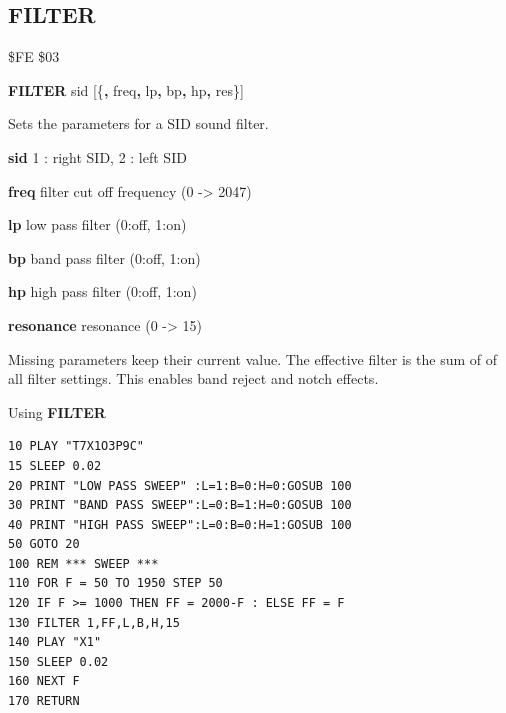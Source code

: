 
\newpage
\subsection{FILTER}
\begin{description}[leftmargin=2cm,style=nextline]
\item [Token:] \$FE \$03
\item [Format:] {\bf FILTER} sid [\{{\bf,} freq{\bf,} lp{\bf,} bp{\bf,}
		hp{\bf,} res\}]
\item [Usage:] Sets the parameters for a SID sound filter.

      {\bf sid} 1 : right SID, 2 : left SID

      {\bf freq} filter cut off frequency (0 -> 2047)

      {\bf lp} low pass filter (0:off, 1:on)

      {\bf bp} band pass filter (0:off, 1:on)

      {\bf hp} high pass filter (0:off, 1:on)

      {\bf resonance} resonance (0 -> 15)

\item [Remarks:] Missing parameters keep their current value.
                 The effective filter is the sum of
                 of all filter settings.
                 This enables band reject and notch effects.

\item [Example:]
                Using {\bf FILTER}
\begin{tcolorbox}[colback=black,coltext=white]
\verbatimfont{\codefont}
\begin{verbatim}
10 PLAY "T7X1O3P9C"
15 SLEEP 0.02
20 PRINT "LOW PASS SWEEP" :L=1:B=0:H=0:GOSUB 100
30 PRINT "BAND PASS SWEEP":L=0:B=1:H=0:GOSUB 100
40 PRINT "HIGH PASS SWEEP":L=0:B=0:H=1:GOSUB 100
50 GOTO 20
100 REM *** SWEEP ***
110 FOR F = 50 TO 1950 STEP 50
120 IF F >= 1000 THEN FF = 2000-F : ELSE FF = F
130 FILTER 1,FF,L,B,H,15
140 PLAY "X1"
150 SLEEP 0.02
160 NEXT F
170 RETURN
\end{verbatim}
\end{tcolorbox}
\end{description}


\newpage
